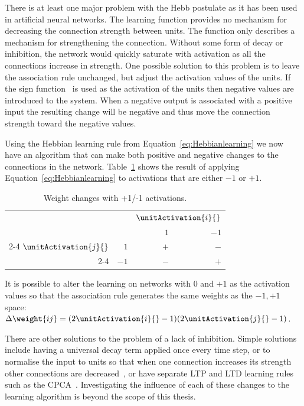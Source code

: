 There is at least one major problem with the Hebb postulate as it has been used in artificial neural networks.  The learning function provides no mechanism for decreasing the connection strength between units.  The function only describes a mechanism for strengthening the connection.  Without some form of decay or inhibition, the network would quickly saturate with activation as all the connections increase in strength. One possible solution to this problem is to leave the association rule unchanged, but adjust the activation values of the units.  If the sign function~\sign{} is used as the activation of the units then negative values are introduced to the system.  When a negative output is associated with a positive input the resulting change will be negative and thus move the connection strength toward the negative values. 

Using the Hebbian learning rule from Equation~\eqref{eq:Hebbianlearning} we now have an algorithm that can make both positive and negative changes to the connections in the network. Table~\ref{tab:WeightChangesHopfield} shows the result of applying Equation~\eqref{eq:Hebbianlearning} to activations that are either $-1$ or $+1$.

\begin{table}[htbp]
	\begin{center}
		\begin{tabular}{rr|r|r}
			\multicolumn{2}{r}{}&\multicolumn{2}{c}{\(\unitActivation{i}{}\)}\\
						&&$1$&$-1$\\
\cline{2-4} $\unitActivation{j}{}$&$1$&$+$&$-$\\
\cline{2-4} &$-1$&$-$&$+$\\
		\end{tabular}
	\end{center}
	\caption{Weight changes with +1/-1 activations.}
	\label{tab:WeightChangesHopfield}
\end{table}

It is possible to alter the learning on networks with $0$ and $+1$ as the activation values so that the association rule generates the same weights as the $-1,+1$ space: $\Delta\weight{ij} = (2\unitActivation{i}{}-1)(2\unitActivation{j}{}-1)$.

There are other solutions to the problem of a lack of inhibition.  Simple solutions include having a universal decay term applied once every time step, or to normalise the input to units so that when one connection increases its strength other connections are decreased~\citep{Chechik2001}, or have separate LTP and LTD learning rules such as the CPCA~\citep{Norman2003}.  Investigating the influence of each of these changes to the learning algorithm is beyond the scope of this thesis.

